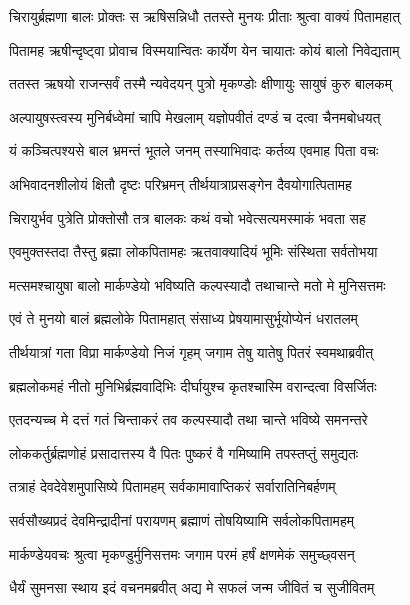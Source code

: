 \twolineshloka
{चिरायुर्ब्रह्मणा बालः प्रोक्तः स ऋषिसन्निधौ}
{ततस्ते मुनयः प्रीताः श्रुत्वा वाक्यं पितामहात्} %

\twolineshloka
{पितामह ऋषीन्दृष्ट्वा प्रोवाच विस्मयान्वितः}
{कार्येण येन चायातः कोयं बालो निवेद्यताम्} %

\twolineshloka
{ततस्त ऋषयो राजन्सर्वं तस्मै न्यवेदयन्}
{पुत्रो मृकण्डोः क्षीणायुः सायुषं कुरु बालकम्} %

\twolineshloka
{अल्पायुषस्त्वस्य मुनिर्बध्वेमां चापि मेखलाम्}
{यज्ञोपवीतं दण्डं च दत्वा चैनमबोधयत्} %

\twolineshloka
{यं कञ्चित्पश्यसे बाल भ्रमन्तं भूतले जनम्}
{तस्याभिवादः कर्तव्य एवमाह पिता वचः} %

\twolineshloka
{अभिवादनशीलोयं क्षितौ दृष्टः परिभ्रमन्}
{तीर्थयात्राप्रसङ्गेन दैवयोगात्पितामह} %

\twolineshloka
{चिरायुर्भव पुत्रेति प्रोक्तोसौ तत्र बालकः}
{कथं वचो भवेत्सत्यमस्माकं भवता सह} %

\twolineshloka
{एवमुक्तस्तदा तैस्तु ब्रह्मा लोकपितामहः}
{ऋतवाक्यादियं भूमिः संस्थिता सर्वतोभया} %



\twolineshloka
{मत्समश्चायुषा बालो मार्कण्डेयो भविष्यति}
{कल्पस्यादौ तथाचान्ते मतो मे मुनिसत्तमः} %

\twolineshloka
{एवं ते मुनयो बालं ब्रह्मलोके पितामहात्}
{संसाध्य प्रेषयामासुर्भूयोप्येनं धरातलम्} %

\twolineshloka
{तीर्थयात्रां गता विप्रा मार्कण्डेयो निजं गृहम्}
{जगाम तेषु यातेषु पितरं स्वमथाब्रवीत्} %

\twolineshloka
{ब्रह्मलोकमहं नीतो मुनिभिर्ब्रह्मवादिभिः}
{दीर्घायुश्च कृतश्चास्मि वरान्दत्वा विसर्जितः} %

\twolineshloka
{एतदन्यच्च मे दत्तं गतं चिन्ताकरं तव}
{कल्पस्यादौ तथा चान्ते भविष्ये समनन्तरे} %

\twolineshloka
{लोककर्तुर्ब्रह्मणोहं प्रसादात्तस्य वै पितः}
{पुष्करं वै गमिष्यामि तपस्तप्तुं समुद्यतः} %

\twolineshloka
{तत्राहं देवदेवेशमुपासिष्ये पितामहम्}
{सर्वकामावाप्तिकरं सर्वारातिनिबर्हणम्} %

\twolineshloka
{सर्वसौख्यप्रदं देवमिन्द्रादीनां परायणम्}
{ब्रह्माणं तोषयिष्यामि सर्वलोकपितामहम्} %

\twolineshloka
{मार्कण्डेयवचः श्रुत्वा मृकण्डुर्मुनिसत्तमः}
{जगाम परमं हर्षं क्षणमेकं समुच्छ्वसन्} %

\twolineshloka
{धैर्यं सुमनसा स्थाय इदं वचनमब्रवीत्}
{अद्य मे सफलं जन्म जीवितं च सुजीवितम्} %

